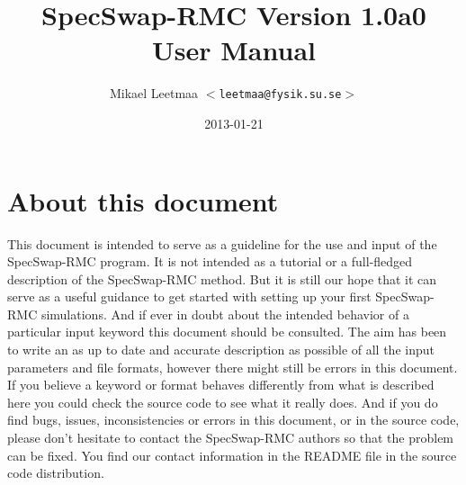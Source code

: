 \documentclass[a4paper, 10pt]{article}
\begin{document}


\title{\LARGE SpecSwap-RMC Version 1.0a0 \\ User Manual}

\date{2013-01-21}

\author{Mikael Leetmaa \hspace{5mm} $<${\tt leetmaa@fysik.su.se}$>$}

\maketitle

\tableofcontents

\section{About this document}
This document is intended to serve as a guideline for the use and input of the
SpecSwap-RMC program. It is not intended as a tutorial or a
full-fledged description of the SpecSwap-RMC method. But it is still
our hope that it can serve as a useful guidance to get started with
setting up your first SpecSwap-RMC simulations. And if ever in doubt
about the intended behavior of a particular input keyword this
document should be consulted.
The aim has been to write an as up to date and
accurate description as possible of all the input parameters and file
formats, however there might still be errors
in this document. If you believe a keyword or format behaves
differently from what is described here you could check the source
code to see what it really does. And if you do find bugs, issues,
inconsistencies or errors in this
document, or in the source code, please don't hesitate to contact the SpecSwap-RMC authors so that
the problem can be fixed. You find our contact information in the
README file in the source code distribution.
\end{document}
